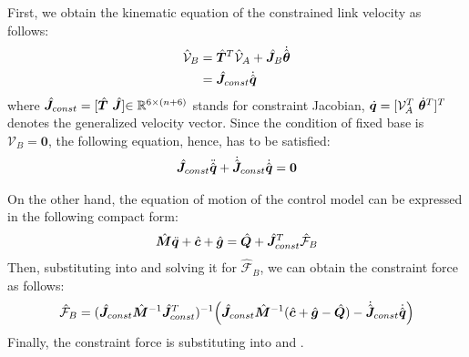First, we obtain the kinematic equation of the constrained link velocity as follows:
% 
\begin{align}
  \hat{\mathcal{V}}_{B} &= {\hat{\bm{T}}}^{T}\hat{\mathcal{V}}_{A} + {\hat{\bm{J}}}_{B}{\dot{\hat{\bm{\theta}}}} \notag\\
  &= {\hat{\bm{J}}}_{const}\dot{\hat{\bm{q}}}
\end{align}
%
where ${\hat{\bm{J}}}_{const} = [{\hat{\bm{T}}}~{\hat{\bm{J}}}]{\in\mathbb{R}^{6 \times (n+6)}}$ stands for constraint Jacobian,
$\dot{\bm{q}} = [\mathcal{V}_{A}^{T}~{\dot{\bm{\theta}}}^{T}]^{T}$ denotes the generalized velocity vector.
Since the condition of fixed base is $\mathcal{V}_{B} = \bm{0}$,
the following equation, hence, has to be satisfied:
% 
\begin{align}
  {\hat{\bm{J}}}_{const}\ddot{\hat{\bm{q}}} + \dot{{\hat{\bm{J}}}}_{const}\dot{\hat{\bm{q}}} = \bm{0}\label{eq:CONST_MF}
\end{align}
%

On the other hand,
the equation of motion of the control model can be expressed in the following compact form:
%
\begin{align}
  \hat{\bm{M}}\ddot{\bm{q}} + \hat{\bm{c}} + \hat{\bm{g}} = \hat{\bm{Q}} + {\hat{\bm{J}}}_{const}^{T}\hat{\mathcal{F}}_{B}\label{eq:EOM_MF_COMP}
\end{align}
%
Then, substituting  into  and solving it for $\hat{\mathcal{F}}_{B}$,
we can obtain the constraint force as follows:
%
\begin{align}
  \hat{\mathcal{F}}_{B} = ({\hat{\bm{J}}}_{const}{\hat{\bm{M}}}^{-1}{\hat{\bm{J}}}_{const}^{T})^{-1}\Big({\hat{\bm{J}}}_{const}{\hat{\bm{M}}}^{-1}({\hat{\bm{c}}} + {\hat{\bm{g}}} - {\hat{\bm{Q}}})
  - \dot{{\hat{\bm{J}}}}_{const}\dot{\hat{\bm{q}}}\Big)
\end{align}
%
Finally, the constraint force is substituting into  and .



